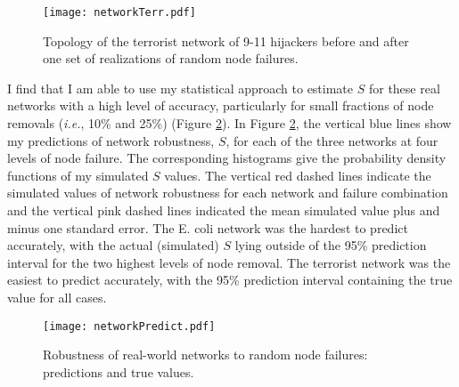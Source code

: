 

\begin{figure}[!htp]
\begin{center}
\texttt{[image: networkTerr.pdf]}
\caption[Topology of the terrorist network of 9-11 hijackers.]{\label{fig:ch2:terr}Topology of the terrorist network of 9-11 hijackers \cite{Shaikh2007} before and after one set of realizations of random node failures.}
\end{center}
\end{figure}


I find that I am able to use my statistical approach to estimate $S$ for these real networks with a high level of accuracy, particularly for small fractions of node removals (\emph{i.e.}, 10\% and 25\%) (Figure \ref{fig:ch2:predict}). In Figure \ref{fig:ch2:predict}, the vertical blue lines show my predictions of network robustness, $S$, for each of the three networks at four levels of node failure. The corresponding histograms give the probability density functions of my simulated $S$ values. The vertical red dashed lines indicate the simulated values of network robustness for each network and failure combination and the vertical pink dashed lines indicated the mean simulated value plus and minus one standard error. The E. coli network was the hardest to predict accurately, with the actual (simulated) $S$ lying outside of the 95\% prediction interval for the two highest levels of node removal. The terrorist network was the easiest to predict accurately, with the 95\% prediction interval containing the true value for all cases.


\begin{figure}[!htp]
\begin{center}
\texttt{[image: networkPredict.pdf]}
\caption{\label{fig:ch2:predict}Robustness of real-world networks to random node failures: predictions and true values.}
\end{center}
\end{figure}


